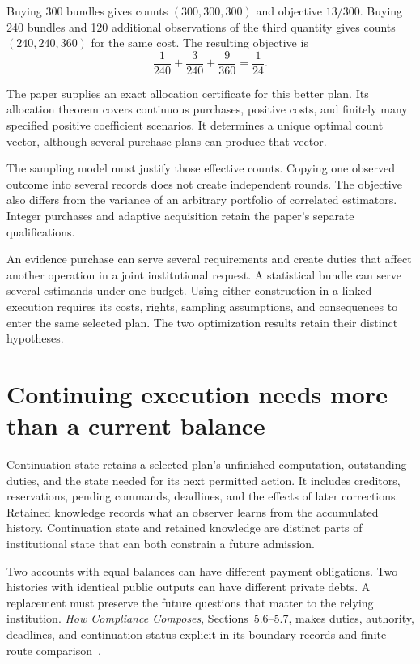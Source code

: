 \documentclass{momentum}
\begin{document}
Buying 300 bundles gives counts $(300,300,300)$ and objective $13/300$.
Buying 240 bundles and 120 additional observations of the third quantity gives counts $(240,240,360)$ for the same cost.
The resulting objective is
\[
\frac{1}{240}+\frac{3}{240}+\frac{9}{360}=\frac{1}{24}.
\]

The paper supplies an exact allocation certificate for this better plan.
Its allocation theorem covers continuous purchases, positive costs, and finitely many specified positive coefficient scenarios.
It determines a unique optimal count vector, although several purchase plans can produce that vector.

The sampling model must justify those effective counts.
Copying one observed outcome into several records does not create independent rounds.
The objective also differs from the variance of an arbitrary portfolio of correlated estimators.
Integer purchases and adaptive acquisition retain the paper's separate qualifications.

An evidence purchase can serve several requirements and create duties that affect another operation in a joint institutional request.
A statistical bundle can serve several estimands under one budget.
Using either construction in a linked execution requires its costs, rights, sampling assumptions, and consequences to enter the same selected plan.
The two optimization results retain their distinct hypotheses.

\section{Continuing execution needs more than a current balance}
\label{sec:continuation}

Continuation state retains a selected plan's unfinished computation, outstanding duties, and the state needed for its next permitted action.
It includes creditors, reservations, pending commands, deadlines, and the effects of later corrections.
Retained knowledge records what an observer learns from the accumulated history.
Continuation state and retained knowledge are distinct parts of institutional state that can both constrain a future admission.

Two accounts with equal balances can have different payment obligations.
Two histories with identical public outputs can have different private debts.
A replacement must preserve the future questions that matter to the relying institution.
\emph{How Compliance Composes}, Sections~5.6--5.7, makes duties, authority, deadlines, and continuation status explicit in its boundary records and finite route comparison~\cite{compliance}.
\end{document}
